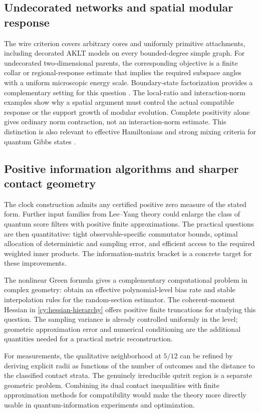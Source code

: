 \subsection{Undecorated networks and spatial modular response}

The wire criterion covers arbitrary cores and uniformly primitive
attachments, including decorated AKLT models on every bounded-degree
simple graph. For undecorated two-dimensional parents, the corresponding
objective is a finite collar or regional-response estimate that implies
the required subspace angles with a uniform microscopic energy scale.
Boundary-state factorization provides a complementary setting for this
question \citep{Kastoryano2026}. The local-ratio and interaction-norm
examples show why a spatial argument must control the actual compatible
response or the support growth of modular evolution. Complete positivity
alone gives ordinary norm contraction, not an interaction-norm estimate.
This distinction is also relevant to effective Hamiltonians and strong
mixing criteria for quantum Gibbs states
\citep{BluhmCapelPerezHernandez2025}.

\subsection{Positive information algorithms and sharper contact geometry}

The clock construction admits any certified positive zero measure of the
stated form. Further input families from Lee--Yang theory could enlarge
the class of quantum score filters with positive finite approximations.
The practical questions are then quantitative: tight observable-specific
commutator bounds, optimal allocation of deterministic and sampling error,
and efficient access to the required weighted inner products. The
information-matrix bracket is a concrete target for these improvements.

The nonlinear Green formula gives a complementary computational problem
in complex geometry: obtain an effective polynomial-level bias rate and
stable interpolation rules for the random-section estimator. The
coherent-moment Hessian in \eqref{cy:hessian-hierarchy} offers positive
finite truncations for studying this question. The sampling variance is
already controlled uniformly in the level; geometric approximation error
and numerical conditioning are the additional quantities needed for a
practical metric reconstruction.

For measurements, the qualitative neighborhood at $5/12$ can be refined
by deriving explicit radii as functions of the number of outcomes and the
distance to the classified contact strata. The genuinely irreducible
qutrit region is a separate geometric problem. Combining its dual
contact inequalities with finite approximation methods for compatibility
\citep{PortoDesignollePokuttaQuintino2026} would make the theory more
directly usable in quantum-information experiments and optimization.
